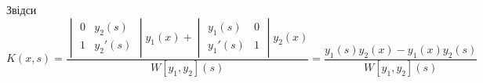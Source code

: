 Звідси
\begin{equation*}
	K(x, s) = \frac{\begin{vmatrix} 0 & y_2(s) \\ 1 & y_2'(s) \end{vmatrix} y_1(x) + \begin{vmatrix} y_1(s) & 0 \\ y_1'(s) & 1 \end{vmatrix} y_2(x) }{W[y_1, y_2](s)} = \frac{y_1(s) y_2(x) - y_1(x) y_2(s)}{W[y_1, y_2](s)}
\end{equation*}
